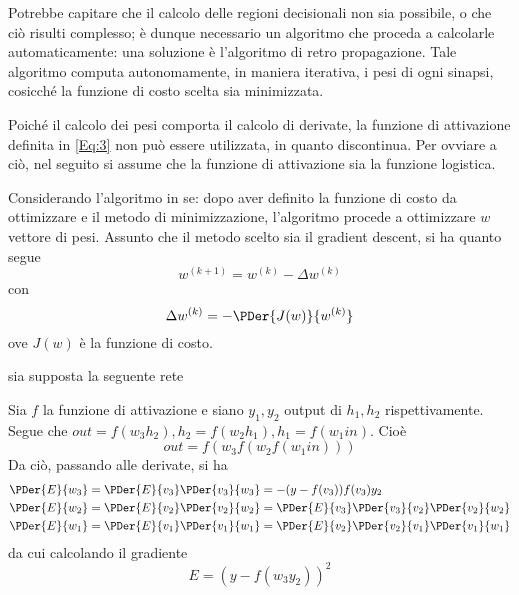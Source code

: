 \documentclass{subfiles}
\begin{document}
Potrebbe capitare che il calcolo delle regioni decisionali non sia possibile, o che ciò risulti complesso;
è dunque necessario un algoritmo che proceda a calcolarle automaticamente: una soluzione è l'algoritmo di retro propagazione.
Tale algoritmo computa autonomamente, in maniera iterativa, i pesi di ogni sinapsi, cosicché la funzione di costo scelta sia minimizzata.

\begin{Remark*}
    Poiché il calcolo dei pesi comporta il calcolo di derivate, la funzione di attivazione definita in \eqref{Eq:3} non può essere utilizzata,
    in quanto discontinua. Per ovviare a ciò, nel seguito si assume che la funzione di attivazione sia la funzione logistica.
\end{Remark*}

Considerando l'algoritmo in se: dopo aver definito la funzione di costo da ottimizzare e il metodo di minimizzazione,
l'algoritmo procede a ottimizzare \(w\) vettore di pesi.
Assunto che il metodo scelto sia il gradient descent, si ha quanto segue
\[
    w^{(k + 1)} = w^{(k)} - \Delta w^{(k)}
\]
con
\[
    \Delta w^{(k)} = - \PDer{J(w)}{w^{(k)}}
\]
ove \(J(w)\) è la funzione di costo.

\begin{Example*}
    sia supposta la seguente rete
    
\end{Example*}
Sia \(f\) la funzione di attivazione e siano \(y_{1}, y_{2}\) output di \(h_{1}, h_{2}\) rispettivamente.
Segue che \(out = f(w_{3} h_{2}), h_{2} = f(w_{2} h_{1}), h_{1} = f(w_{1} in)\). Cioè
\[
    out = f(w_{3} f(w_{2} f(w_{1} in)))
\]
Da ciò, passando alle derivate, si ha
\[\begin{aligned}
        \PDer{E}{w_{3}} & = \PDer{E}{v_{3}} \PDer{v_{3}}{w_{3}} = - (y - f(v_{3})) f(v_{3}) y_{2}                         \\
        \PDer{E}{w_{2}} & = \PDer{E}{v_{2}} \PDer{v_{2}}{w_{2}} = \PDer{E}{v_{3}} \PDer{v_{3}}{v_{2}} \PDer{v_{2}}{w_{2}} \\
        \PDer{E}{w_{1}} & = \PDer{E}{v_{1}} \PDer{v_{1}}{w_{1}} = \PDer{E}{v_{2}} \PDer{v_{2}}{v_{1}} \PDer{v_{1}}{w_{1}} \\
    \end{aligned}\]
da cui calcolando il gradiente
\[
    E = (y - f(w_{3} y_{2}))^{2}
\]
\end{document}
